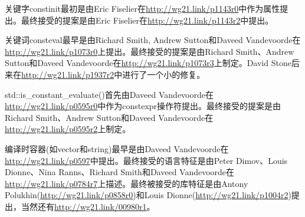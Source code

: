 关键字constinit最初是由Eric Fiselier在\url{http://wg21.link/p1143r0}中作为属性提出。最终接受的提案是由Eric Fiselier在\url{http://wg21.link/p1143r2}中提出。

关键词consteval最早是由Richard Smith, Andrew Sutton和Daveed Vandevoorde在\url{http://wg21.link/p1073r0}上提出。最终接受的提案是由Richard Smith、Andrew Sutton和Daveed Vandevoorde在\url{http://wg21.link/p1073r3}上制定。David Stone后来在\url{http://wg21.link/p1937r2}中进行了一个小的修复。

std::is\_constant\_evaluate()首先由Daveed Vandevoorde在\url{http://wg21.link/p0595r0}中作为constexpr操作符提出。最终接受的提案是由Richard Smith、Andrew Sutton和Daveed Vandevoorde在\url{http://wg21.link/p0595r2}上制定。

编译时容器(如vector和string)最早是由Daveed Vandevoorde在\url{http://wg21.link/p0597}中提出。最终接受的语言特征是由Peter Dimov、Louis Dionne、Nina Ranns、Richard Smith和Daveed Vandevoorde在\url{http://wg21.link/p0784r7}上描述。最终被接受的库特征是由Antony Polukhin(\url{http://wg21.link/p0858r0})和Louis Dionne(\url{http://wg21.link/p1004r2})提出，当然还有\url{http://wg21.link/00980r1}。